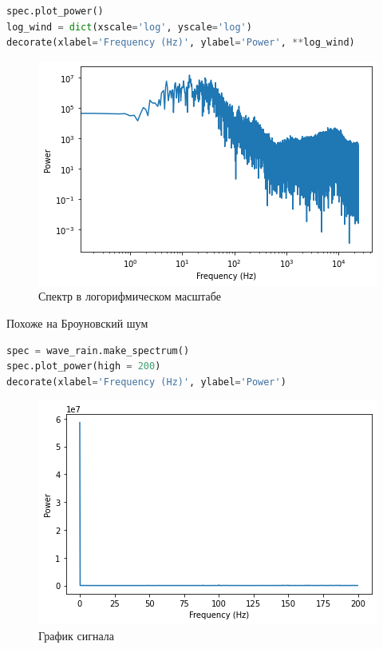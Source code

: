 \begin{lstlisting}[language=Python]
spec.plot_power()
log_wind = dict(xscale='log', yscale='log')
decorate(xlabel='Frequency (Hz)', ylabel='Power', **log_wind)
\end{lstlisting}

\begin{figure}[H]
	\begin{center}
		\includegraphics[scale=1]{fig/lab04/lab04_02.png}
		\caption{Спектр в логорифмическом масштабе}
	\end{center}
\end{figure}

Похоже на Броуновский шум


\begin{lstlisting}[language=Python]
spec = wave_rain.make_spectrum()
spec.plot_power(high = 200)
decorate(xlabel='Frequency (Hz)', ylabel='Power')

\end{lstlisting}

\begin{figure}[H]
	\begin{center}
		\includegraphics[scale=1]{fig/lab04/lab04_03.png}
		\caption{График сигнала}
	\end{center}
\end{figure}

